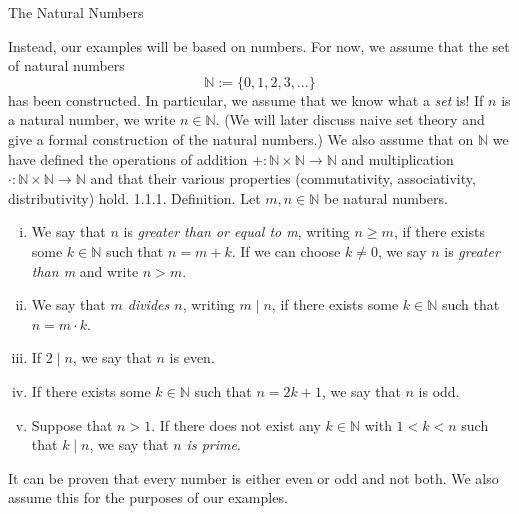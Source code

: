 \documentclass[smaller,hyperref={CJKbookmarks=true}]{beamer}
\newcommand{\N}{\mathbb{N}} \newcommand{\Z}{\mathbb{Z}} \newcommand{\Q}{\mathbb{Q}}
\begin{document}
\begin{frame}{The Natural Numbers}
\begin{spacing}{1.1}
\vspace*{12pt}
Instead, our examples will be based on numbers. For now, we assume that
the set of natural numbers
\[\N:=\{0,1,2,3,...\}\]
has been constructed. In particular, we assume that we know what a \emph{set} is! If $n$ is a natural number, we write $n\in\N$. (We will later discuss naive set theory and give a formal construction of the natural numbers.) We also assume that on $\N$ we have defined the operations of addition $+\!:\N\times\N\to\N$ and multiplication $\cdot:\N\times\N\to\N$ and that their various properties (commutativity, associativity, distributivity) hold.
\newpage
\alert{1.1.1. Definition.} Let $m,n\in\N$ be natural numbers.
\begin{enumerate}[(i)]
  \item We say that $n$ is \emph{greater than or equal to m}, writing $n\geqslant m$, if there exists some $k\in\N$ such that $n=m+k$. If we can choose $k\neq0$, we say $n$ is \emph{greater than m} and write $n>m$.
  \item We say that \emph{$m$ divides $n$}, writing $m\mid n$, if there exists some $k\in\N$ such that $n=m\cdot k$.
  \item If $2\mid n$, we say that $n$ is even.
  \item If there exists some $k\in\N$ such that $n=2k+1$, we say that $n$ is odd.
  \item Suppose that $n>1$. If there does not exist any $k\in\N$ with $1<k<n$ such that $k\mid n$, we say that \emph{$n$ is prime}.
\end{enumerate}
It can be proven that every number is either even or odd and not both.
We also assume this for the purposes of our examples.
\end{spacing}
\end{frame}
\end{document}
